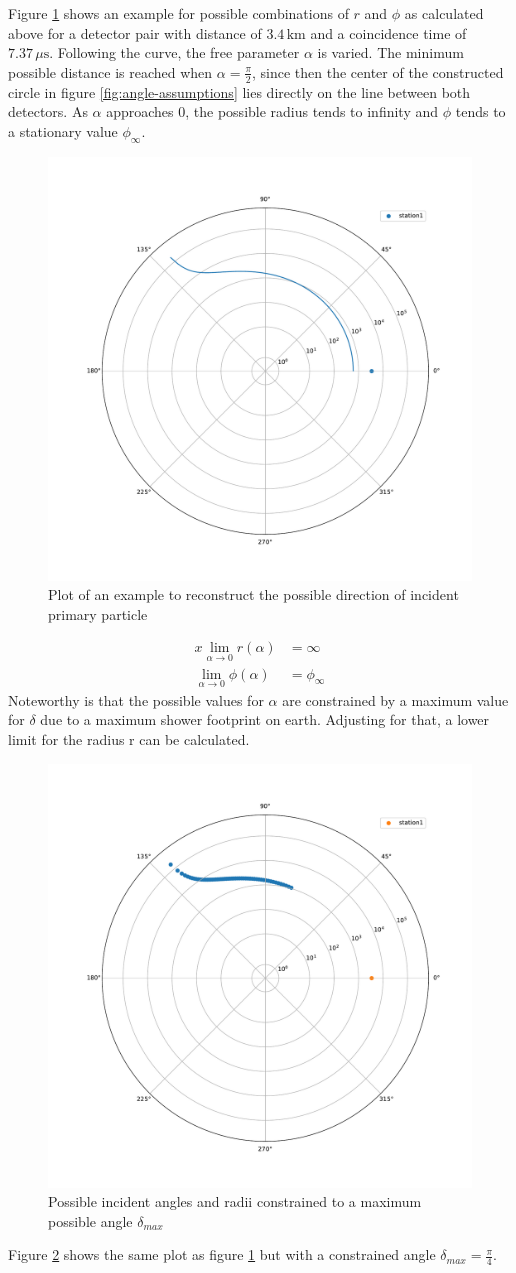 \documentclass[abstract,toc,los,lof,english,10pt,glossary,acronyms]{jluthesis}
\begin{document}
Figure \ref{fig:reconstruction_example} shows an example for possible combinations of $r$ and $\phi$ as calculated above for a detector pair with distance of $3.4\,\text{km}$ and a coincidence time of $7.37\,\mu\text{s}$. Following the curve, the free parameter $\alpha$ is varied. The minimum possible distance is reached when $\alpha=\frac{\pi}{2}$, since then the center of the constructed circle in figure \ref{fig:angle-assumptions} lies directly on the line between both detectors. As $\alpha$ approaches $0$, the possible radius tends to infinity and $\phi$ tends to a stationary value $\phi_\infty$.
\begin{figure}[ht!]
	\centering
	\includegraphics[width=0.4\linewidth]{data/example_plot_vertical}
	\caption{Plot of an example to reconstruct the possible direction of incident primary particle}
	\label{fig:reconstruction_example}
\end{figure}
\begin{equation}
	\begin{aligned}
		x\lim_{\alpha\rightarrow0}r\left(\alpha\right) &= \infty\\
		\lim_{\alpha\rightarrow0}\phi\left(\alpha\right) &= \phi_\infty
	\end{aligned}
\end{equation}
Noteworthy is that the possible values for $\alpha$ are constrained by a maximum value for $\delta$ due to a maximum shower footprint on earth. Adjusting for that, a lower limit for the radius r can be calculated.
\begin{figure}[ht!]
	\centering
	\includegraphics[width=0.4\linewidth]{data/example_plot_vertical_constrained}
	\caption{Possible incident angles and radii constrained to a maximum possible angle $\delta_{max}$}
	\label{fig:reconstruction_example_constrained}
\end{figure}
Figure \ref{fig:reconstruction_example_constrained} shows the same plot as figure \ref{fig:reconstruction_example} but with a constrained angle $\delta_{max} = \frac{\pi}{4}$.
\end{document}
